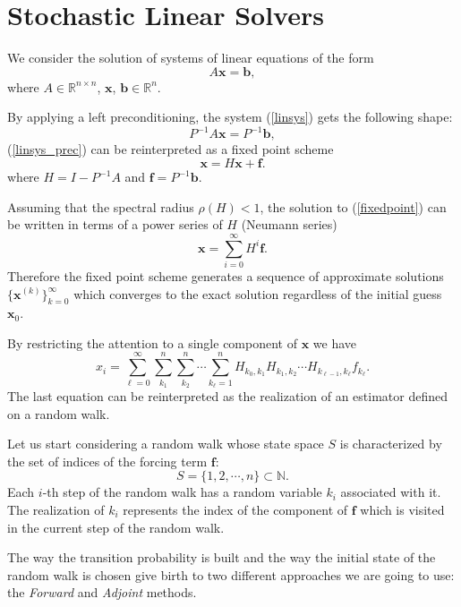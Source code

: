 \section{Stochastic Linear Solvers}

We consider the solution of systems of linear equations of the form
\begin{equation}
A \mathbf{x}=\mathbf{b},
\label{linsys}
\end{equation}
where $A\in \mathbb{R}^{n\times n}$, $\mathbf{x}$, $\mathbf{b} \in
\mathbb{R}^n$.

By applying a left preconditioning, the system (\ref{linsys}) gets the
following shape:
\begin{equation}
P^{-1}A \mathbf{x}=P^{-1}\mathbf{b},
\label{linsys_prec}
\end{equation}
(\ref{linsys_prec}) can be
reinterpreted as a fixed point scheme
\begin{equation}
 \mathbf{x}=H\mathbf{x}+\mathbf{f}.
 \label{fixedpoint}
\end{equation}
where $H=I-P^{-1}A$ and $\mathbf{f}=P^{-1}\mathbf{b}$.

Assuming that the spectral radius $\rho(H)<1$, the solution to
(\ref{fixedpoint}) can be written in terms of a power series of
$H$ (Neumann series)
\[
\mathbf{x}=\sum_{i=0}^\infty H^i\mathbf{f}.
\]
Therefore the fixed point scheme generates a sequence of approximate solutions
$\{\mathbf{x}^{(k)}\}_{k=0}^{\infty}$ which converges to the exact solution
regardless of the initial guess $\mathbf{x}_0$.

By restricting the attention to a single component of $\mathbf{x}$ we
have
\begin{equation}
x_i=\sum_{\ell=0}^\infty \sum_{k_1}^n\sum_{k_2}^n\cdots \sum_{k_{\ell}=1}^n
H_{k_0,k_1}H_{k_1,k_2}\cdots H_{k_{\ell-1}, k_{\ell}}f_{k_{\ell}}.
\label{forward}
\end{equation}
The last equation can be reinterpreted as the realization of an estimator
defined on a random walk.

Let us start considering a random walk whose
state space $S$ is characterized by the set of indices of the forcing term
$\mathbf{f}$:
\[
S=\{1,2,\cdots, n\} \subset \mathbb{N}.
\]
Each $i$-th step of the random walk has a random variable
$k_i$ associated with it. The realization of $k_i$ represents the index of the
component of $\mathbf{f}$
which is visited in the current step of the random walk.

The way the transition probability is built and the way the initial state of
the random walk is chosen give birth to two different approaches we are
going to use: the \textit{Forward} and \textit{Adjoint} methods.

